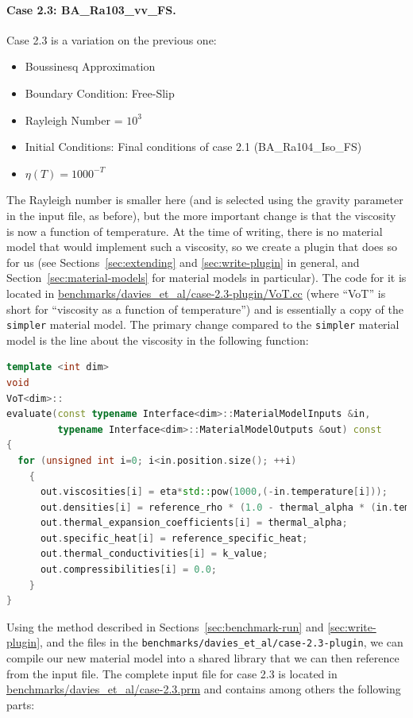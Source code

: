 \documentclass{article}
\begin{document}
\paragraph{Case 2.3: BA\_Ra103\_vv\_FS.}
\label{sec:davies-case23_BA}

Case 2.3 is a variation on the previous one:
\begin{itemize}
\item Boussinesq Approximation
\item Boundary Condition: Free-Slip
\item Rayleigh Number = $10^3$
\item Initial Conditions: Final conditions of case 2.1 (BA\_Ra104\_Iso\_FS)
\item $\eta(T) = 1000^{-T}$
\end{itemize}
The Rayleigh number is smaller here (and is selected using the gravity
parameter in the input file, as before), but the more important change is that the
viscosity is now a function of temperature. At the time of writing, there is
no material model that would implement such a viscosity, so we
create a plugin that does so for us (see Sections~\ref{sec:extending} and
\ref{sec:write-plugin} in
general, and Section~\ref{sec:material-models} for material models in
particular). The code for it is located in
\url{benchmarks/davies_et_al/case-2.3-plugin/VoT.cc} (where ``VoT'' is short
for ``viscosity as a function of temperature'') and is essentially a copy of
the \texttt{simpler} material model. The primary change compared to the
\texttt{simpler} material model is the line about the viscosity in the
following function:
\begin{lstlisting}[frame=single,language=C++]
template <int dim>
void
VoT<dim>::
evaluate(const typename Interface<dim>::MaterialModelInputs &in,
         typename Interface<dim>::MaterialModelOutputs &out) const
{
  for (unsigned int i=0; i<in.position.size(); ++i)
    {
      out.viscosities[i] = eta*std::pow(1000,(-in.temperature[i]));
      out.densities[i] = reference_rho * (1.0 - thermal_alpha * (in.temperature[i] - reference_T));
      out.thermal_expansion_coefficients[i] = thermal_alpha;
      out.specific_heat[i] = reference_specific_heat;
      out.thermal_conductivities[i] = k_value;
      out.compressibilities[i] = 0.0;
    }
}
\end{lstlisting}
Using the method described in Sections~\ref{sec:benchmark-run} and
\ref{sec:write-plugin}, and the files in
the \texttt{benchmarks/davies\_et\_al/case-2.3-plugin}, we can compile our new
material model into a shared library that we can then reference from the input file.
The complete input file for case 2.3 is located in
\url{benchmarks/davies_et_al/case-2.3.prm} and contains among others the
following parts:
\end{document}
